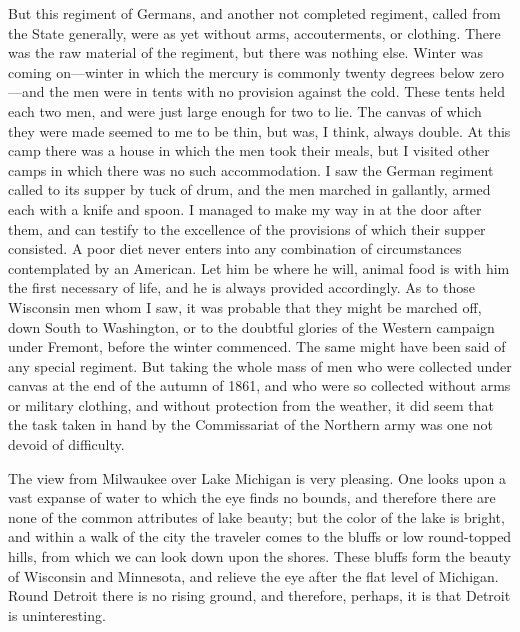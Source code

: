 But this regiment of Germans, and another not completed regiment,
called from the State generally, were as yet without arms,
accouterments, or clothing.  There was the raw material of the
regiment, but there was nothing else.  Winter was coming on---winter
in which the mercury is commonly twenty degrees below zero---and the
men were in tents with no provision against the cold.  These tents
held each two men, and were just large enough for two to lie.  The
canvas of which they were made seemed to me to be thin, but was, I
think, always double.  At this camp there was a house in which the
men took their meals, but I visited other camps in which there was
no such accommodation.  I saw the German regiment called to its
supper by tuck of drum, and the men marched in gallantly, armed
each with a knife and spoon.  I managed to make my way in at the
door after them, and can testify to the excellence of the
provisions of which their supper consisted.  A poor diet never
enters into any combination of circumstances contemplated by an
American.  Let him be where he will, animal food is with him the
first necessary of life, and he is always provided accordingly.  As
to those Wisconsin men whom I saw, it was probable that they might
be marched off, down South to Washington, or to the doubtful
glories of the Western campaign under Fremont, before the winter
commenced.  The same might have been said of any special regiment.
But taking the whole mass of men who were collected under canvas at
the end of the autumn of 1861, and who were so collected without
arms or military clothing, and without protection from the weather,
it did seem that the task taken in hand by the Commissariat of the
Northern army was one not devoid of difficulty.

The view from Milwaukee over Lake Michigan is very pleasing.  One
looks upon a vast expanse of water to which the eye finds no
bounds, and therefore there are none of the common attributes of
lake beauty; but the color of the lake is bright, and within a walk
of the city the traveler comes to the bluffs or low round-topped
hills, from which we can look down upon the shores.  These bluffs
form the beauty of Wisconsin and Minnesota, and relieve the eye
after the flat level of Michigan.  Round Detroit there is no rising
ground, and therefore, perhaps, it is that Detroit is
uninteresting.

